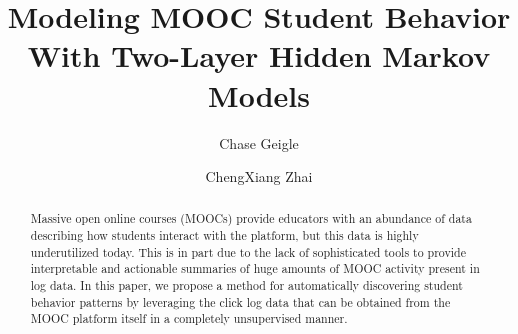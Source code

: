\documentclass[preprint]{sigchi-modern}
\begin{document}
\title{Modeling MOOC Student Behavior With Two-Layer Hidden Markov Models}

\author[1]{Chase Geigle}
\author[1]{ChengXiang Zhai}

\settowidth{\authorwidth}{ChengXiang Zhai1}
\settowidth{\affilwidth}{University of Illinois at Urbana-ChampaignAAA}




\maketitle

\begin{abstract}
  Massive open online courses (MOOCs) provide educators with an abundance
  of data describing how students interact with the platform, but this data
  is highly underutilized today. This is in part due to the lack of
  sophisticated tools to provide interpretable and actionable summaries of
  huge amounts of MOOC activity present in log data. In this paper, we
  propose a method for automatically discovering student behavior patterns
  by leveraging the click log data that can be obtained from the MOOC
  platform itself in a completely unsupervised manner.
\end{abstract}
\end{document}
